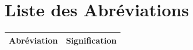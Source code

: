 

\newpage
\chapter*{Liste des Abréviations}

\noindent
\begin{longtable}{@{} p{3.2cm} p{11.5cm} @{}}
    \textbf{Abréviation} & \textbf{Signification} \\
    \midrule
    \endhead


\end{longtable}

